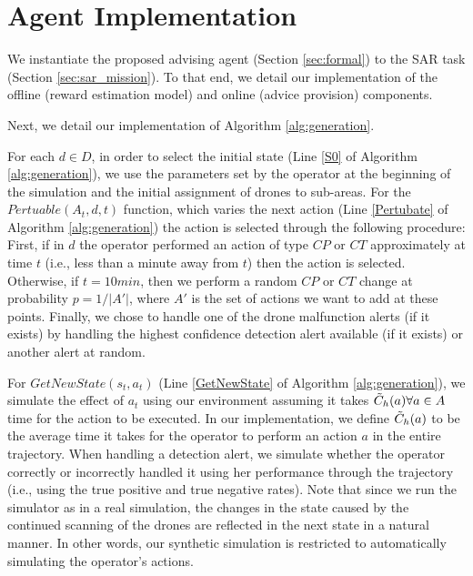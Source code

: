 \section{Agent Implementation}

We instantiate the proposed advising agent  (Section \ref{sec:formal}) to the SAR task (Section \ref{sec:sar_mission}). To that end, we detail our implementation of the offline (reward estimation model) and online (advice provision) components.

Next, we detail our implementation of Algorithm \ref{alg:generation}. 

For each $d\in D$, in order to select the initial state (Line \ref{S0} of Algorithm \ref{alg:generation}),  we use the parameters set by the operator at the beginning of the simulation and the initial assignment of drones to sub-areas.
For the $Pertuable(A_t,d,t)$ function, which varies the next action (Line \ref{Pertubate} of Algorithm \ref{alg:generation}) the action is selected through the following procedure: First, if in $d$ the operator performed an action of type $CP$ or $CT$ approximately at time $t$ (i.e., less than a minute away from $t$) then the action is selected. Otherwise, if $t=10min$, 
then we perform a random $CP$ or $CT$ change at probability $p = 1/|A'|$, where $A'$ is the set of actions we want to add at these points. Finally, we chose to handle one of the drone malfunction alerts (if it exists) by handling the highest confidence detection alert available (if it exists) or another alert at random. 

For $GetNewState(s_t,a_t)$ (Line \ref{GetNewState} of Algorithm \ref{alg:generation}), we simulate the effect of $a_t$ using our environment assuming it takes $\Tilde{C}_h(a) \forall{a\in A}$ time for the action to be executed. In our implementation, we define $\Tilde{C}_h(a)$ to be the average time it takes for the operator to perform an action $a$ in the entire trajectory. When handling a detection alert, we simulate whether the operator correctly or incorrectly handled it using her performance through the trajectory (i.e., using the true positive and true negative rates).
Note that since we run the simulator as in a real simulation, the changes in the state caused by the continued scanning of the drones are reflected in the next state in a natural manner. In other words, our synthetic simulation is restricted to automatically simulating the operator's actions.

